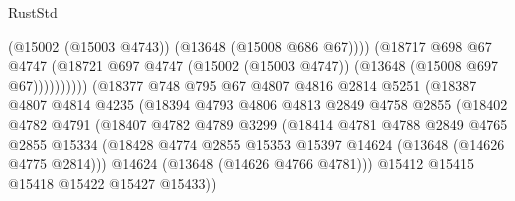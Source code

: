 \begin{lexlean}{RustStd}
\begin{coremodule}
                                          (@15002 (@15003 @4743))
                                          (@13648 (@15008 @686 @67))))
                                      (@18717
                                        @698
                                        @67
                                        @4747
                                        (@18721
                                          @697
                                          @4747
                                          (@15002 (@15003 @4747))
                                          (@13648 (@15008 @697 @67))))))))))
                          (@18377
                            @748
                            @795
                            @67
                            @4807
                            @4816
                            @2814
                            @5251
                            (@18387
                              @4807
                              @4814
                              @4235
                              (@18394
                                @4793
                                @4806
                                @4813
                                @2849
                                @4758
                                @2855
                                (@18402
                                  @4782
                                  @4791
                                  (@18407
                                    @4782
                                    @4789
                                    @3299
                                    (@18414
                                      @4781
                                      @4788
                                      @2849
                                      @4765
                                      @2855
                                      @15334
                                      (@18428
                                        @4774
                                        @2855
                                        @15353
                                        @15397
                                        @14624
                                        (@13648 (@14626 @4775 @2814)))
                                      @14624
                                      (@13648 (@14626 @4766 @4781)))
                                    @15412
                                    @15415
                                    @15418
                                    @15422
                                    @15427
                                    @15433))

\end{coremodule}
\end{lexlean}
